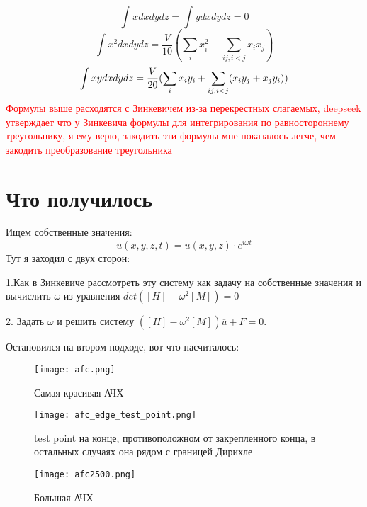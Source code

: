 \documentclass[a4paper,12pt]{article}
\begin{document}
\begin{equation}
    \int xdxdydz = \int ydxdydz = 0 
\end{equation}
\begin{equation}
    \int x^2 dxdydz =  \frac{V}{10} (\sum_i x^2_i + \sum_{ij, i<j} x_i x_j) 
\end{equation}
\begin{equation}
    \int xy \space dxdydz =  \frac{V}{20} (\sum_i x_i y_i + \sum_{ij, i<j}( x_i y_j + x_j y_i)) 
\end{equation}
\textcolor{red}{Формулы выше расходятся с Зинкевичем из-за перекрестных слагаемых, deepseek утверждает что у Зинкевича формулы для интегрирования по равностороннему треугольнику, я ему верю, закодить эти формулы мне показалось легче, чем закодить преобразование треугольника}


\section{Что получилось}

Ищем собственные значения:
\begin{equation}
    u(x,y,z,t) = u(x,y,z)\cdot e^{i\omega t}
\end{equation}
Тут я заходил с двух сторон: \par
1.Как в Зинкевиче рассмотреть эту систему как задачу на собственные значения и вычислить $\omega$ из уравнения $det([H] - \omega^2 [M]) = 0$ \par
2. Задать $\omega$ и решить систему $([H] - \omega^2[M])\overline{u} + \overline{F} = 0$. \par
Остановился на втором подходе, вот что насчиталось:

\begin{figure}[H]
    \centering
    \texttt{[image: afc.png]}
    \caption{Самая красивая АЧХ}
    \label{fig:enter-label}
\end{figure}
\begin{figure}
    \centering
    \texttt{[image: afc\_edge\_test\_point.png]}
    \caption{test point на конце, противоположном от закрепленного конца, в остальных случаях она рядом с границей Дирихле}
    \label{fig:enter-label}
\end{figure}
\begin{figure}
    \centering
    \texttt{[image: afc2500.png]}
    \caption{Большая АЧХ}
    \label{fig:enter-label}
\end{figure}
\end{document}
